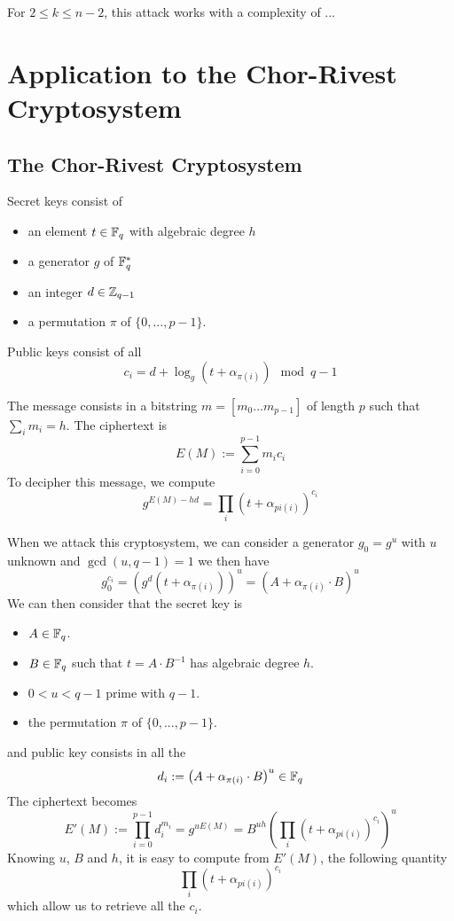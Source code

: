 \documentclass[12pt,a4paper,titlepage]{article}
\newcommand{\GF}[1]{\F_{#1}}
\begin{document}
For $2 \leq k \leq n-2$, this attack works with a complexity of ...


\newpage
\section{Application to the Chor-Rivest Cryptosystem}
\label{sec:CRcrypt}

\subsection{The Chor-Rivest Cryptosystem}

Secret keys consist of
\begin{itemize}
\item an element $t \in \GF{q}$ with algebraic degree $h$
\item a generator $g$ of $\GF{q}^{\ast} $
\item an integer $d \in \mathbb{Z}_{q-1} $
\item a permutation $\pi$ of $\{ 0, ... , p-1 \}$.
\end{itemize}

Public keys consist of all
$$ c_i = d + \log_g(t + \alpha_{\pi(i)}) \mod q-1 $$

The message consists in a bitstring $m = [m_0...m_{p-1}]$ of length $p$ such that $\sum_i m_i = h$. The ciphertext is
$$ E(M) := \sum_{i=0}^{p-1} m_i c_i$$
To decipher this message, we compute
$$ g^{E(M) - hd} =  \prod_i \left( t + \alpha_{pi(i)}\right)^{c_i} $$




When we attack this cryptosystem, we can consider a generator $g_0 = g^u$ with $u$ unknown and $\gcd(u, q-1) = 1$ we then have
$$ g_0^{c_i} = \left( g^d \left( t + \alpha_{\pi(i)} \right) \right)^u = \left(A + \alpha_{\pi(i)} \cdot B\right)^u$$
We can then consider that the secret key is
\begin{itemize}
\item $A \in \mathbb{F}_q$.
\item $B \in \mathbb{F}_q$ such that $t = A\cdot B^{-1}$ has algebraic degree $h$.
\item $0 < u < q-1$ prime with $q-1$.
\item the permutation $\pi$ of $\{ 0, ... , p-1 \}$.
\end{itemize}
and public key consists in all the
$$ d_i := \left(A + \alpha_{\pi(i)} \cdot B\right)^u \in \mathbb{F}_q$$
The ciphertext becomes
$$ E'(M) := \prod_{i=0}^{p-1} d_i^{m_i} = g^{uE(M)} = B^{uh} \left( \prod_i \left( t + \alpha_{pi(i)}\right)^{c_i} \right)^u$$
Knowing $u$, $B$ and $h$, it is easy to compute from $E'(M)$, the following quantity
$$ \prod_i \left( t + \alpha_{pi(i)}\right)^{c_i} $$
which allow us to retrieve all the $c_i$.
\end{document}

